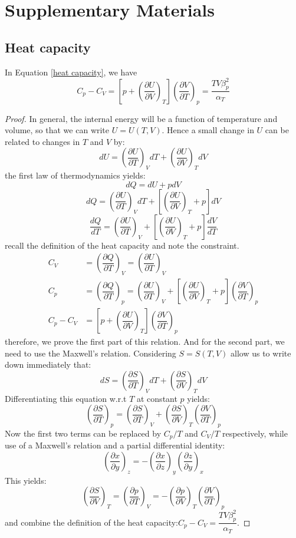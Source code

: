 \documentclass[UTF8]{book}
\begin{document}
\chapter{Supplementary Materials}
\section{Heat capacity}
In Equation \ref{heat capacity}, we have
$$C_p-C_V=\left[p+\left(\dfrac{\partial U}{\partial V}\right)_T\right]\left(\dfrac{\partial V}{\partial T}\right)_p=\dfrac{TV\beta _p^2}{\alpha _T }$$
\begin{proof}
 {In general, the internal energy will be a function of temperature and volume, so that we can write $U=U(T,V)$. Hence a small change in $U$ can be related to changes in $T$ and $V$ by:}
$$dU=\left(\dfrac{\partial U}{\partial T}\right)_VdT+\left(\dfrac{\partial U}{\partial V}\right)_TdV$$
 {the first law of thermodynamics yields:}
$$dQ=dU+pdV$$
$$dQ=\left(\dfrac{\partial U}{\partial T}\right)_VdT+\left[\left(\dfrac{\partial U}{\partial V}\right)_T+p\right]dV$$
$$\dfrac{dQ}{dT}=\left(\dfrac{\partial U}{\partial T}\right)_V+\left[\left(\dfrac{\partial U}{\partial V}\right)_T+p\right]\dfrac{dV}{dT}$$
 {recall the definition of the heat capacity and note the constraint.}
\begin{align*}
C_V&=\left(\dfrac{\partial Q}{\partial T}\right)_V=\left(\dfrac{\partial U}{\partial T}\right)_V\\
C_p&=\left(\dfrac{\partial Q}{\partial T}\right)_p=\left(\dfrac{\partial U}{\partial T}\right)_V+\left[\left(\dfrac{\partial U}{\partial V}\right)_T+p\right]\left(\dfrac{\partial V}{\partial T}\right)_p\\
C_p-C_V&=\left[p+\left(\dfrac{\partial U}{\partial V}\right)_T\right]\left(\dfrac{\partial V}{\partial T}\right)_p
\end{align*}
 {therefore, we prove the first part of this relation. And for the second part, we need to use the Maxwell's relation. Considering $S=S(T,V)$ allow us to write down immediately that:}
$$dS=\left(\dfrac{\partial S}{\partial T}\right)_VdT+\left(\dfrac{\partial S}{\partial V}\right)_TdV$$
 {Differentiating this equation w.r.t $T$ at constant $p$ yields:}
$$\left(\dfrac{\partial S}{\partial T}\right)_p=\left(\dfrac{\partial S}{\partial T}\right)_V+\left(\dfrac{\partial S}{\partial V}\right)_T\left(\dfrac{\partial V}{\partial T}\right)_p$$
 {Now the first two terms can be replaced by $C_p/T$ and $C_V/T$ respectively, while use of a Maxwell's relation and a partial differential identity:}
$$\left(\dfrac{\partial x}{\partial y}\right)_z=-\left(\dfrac{\partial x}{\partial z}\right)_y\left(\dfrac{\partial z}{\partial y}\right)_x$$
 {This yields:}
\[\left(\dfrac{\partial S}{\partial V}\right)_T=\left(\dfrac{\partial p}{\partial T}\right)_V=-\left(\dfrac{\partial p}{\partial V}\right)_T\left(\dfrac{\partial V}{\partial T}\right)_p\]
and combine the definition of the heat capacity:$C_p-C_V=\dfrac{TV\beta _p^2}{\alpha _T }.$
\end{proof}



\end{document}
